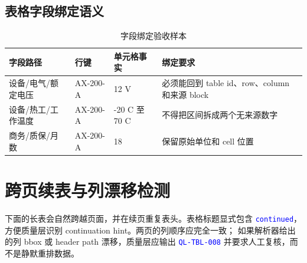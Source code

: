 \documentclass[UTF8,a4paper,11pt]{ctexart}
\newcommand{\testtag}[1]{\textcolor{blue}{\texttt{#1}}}
\begin{document}
\subsection{表格字段绑定语义}

\begin{table}[htbp]
\centering
\caption{字段绑定验收样本}
\small
\begin{tabularx}{\textwidth}{C{0.20\textwidth} C{0.20\textwidth} C{0.20\textwidth} Y}
\toprule
字段路径 & 行键 & 单元格事实 & 绑定要求 \\
\midrule
设备/电气/额定电压 & AX-200-A & 12 V & 必须能回到 table id、row、column 和来源 block \\
设备/热工/工作温度 & AX-200-A & -20 C 至 70 C & 不得把区间拆成两个无来源数字 \\
商务/质保/月数 & AX-200-A & 18 & 保留原始单位和 cell 位置 \\
\bottomrule
\end{tabularx}
\end{table}

\section{跨页续表与列漂移检测}

下面的长表会自然跨越页面，并在续页重复表头。表格标题显式包含
\testtag{continued}，方便质量层识别 continuation hint。两页的列顺序应完全一致；
如果解析器给出的列 bbox 或 header path 漂移，质量层应输出 \testtag{QL-TBL-008}
并要求人工复核，而不是静默重排数据。
\end{document}
